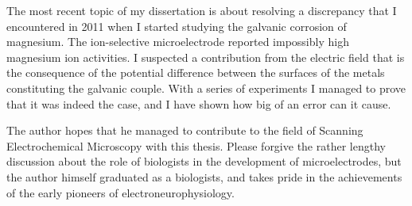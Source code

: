 The most recent topic of my dissertation is about resolving a discrepancy that I encountered in 2011 when I started studying the galvanic corrosion of magnesium.
The ion-selective microelectrode reported impossibly high magnesium ion activities.
I suspected a contribution from the electric field that is the consequence of the potential difference between the surfaces of the metals constituting the galvanic couple.
With a series of experiments I managed to prove that it was indeed the case, and I have shown how big of an error can it cause. 

The author hopes that he managed to contribute to the field of Scanning Electrochemical Microscopy with this thesis.
Please forgive the rather lengthy discussion about the role of biologists in the development of microelectrodes, but the author himself graduated as a biologists, and takes pride in the achievements of the early pioneers of electroneurophysiology.

